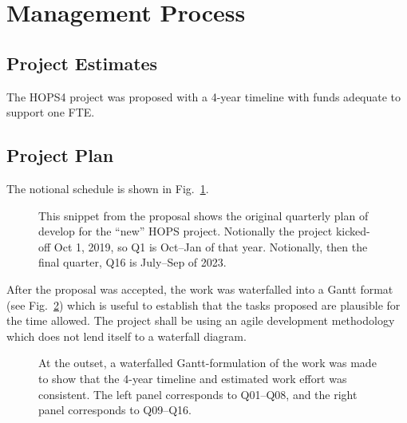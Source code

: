 %
%
\section{Management Process}
\label{sec:managementprocess}

\subsection{Project Estimates}

The HOPS4 project was proposed with a 4-year timeline with funds adequate to support one FTE.


\subsection{Project Plan}

The notional schedule is shown in Fig.~\ref{fig:prop-quarterly}.

\begin{figure}[!h]
  \captionsetup{width=0.6\linewidth}
  \caption[Proposed Quarterly Plan]{This snippet from the proposal shows the original quarterly plan of develop for the ``new'' HOPS project.  Notionally the project kicked-off Oct 1, 2019, so Q1 is Oct--Jan of that year.  Notionally, then the final quarter, Q16 is July--Sep of 2023.}
\label{fig:prop-quarterly}
\end{figure}

After the proposal was accepted, the work was waterfalled into a Gantt format (see Fig.~\ref{fig:ganttcrap}) which is useful to establish that the tasks proposed are plausible for the time allowed.  The project shall be using an agile development methodology which does not lend itself to a waterfall diagram.
\begin{figure}[!h]
  \captionsetup{width=0.7\linewidth}
\caption[Initial Gantt Timeline]{%
At the outset, a waterfalled Gantt-formulation of the work was
made to show that the 4-year timeline and estimated work effort
was consistent. The left panel corresponds to Q01--Q08, and the
right panel corresponds to Q09--Q16.}
\label{fig:ganttcrap}
\end{figure}

